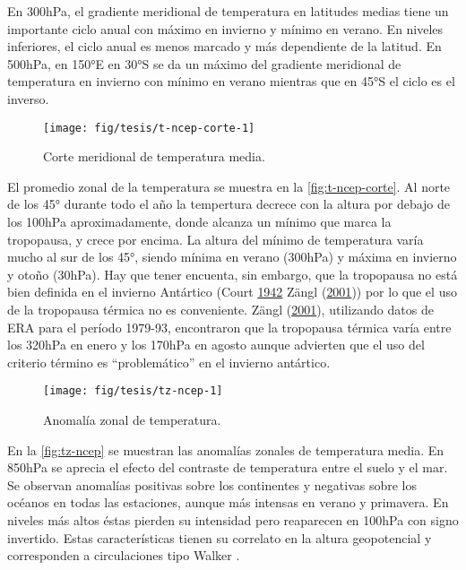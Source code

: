 \documentclass[spanish,a4paper,12p]{book}
\begin{document}
En 300hPa, el gradiente meridional de temperatura en latitudes medias
tiene un importante ciclo anual con máximo en invierno y mínimo en
verano. En niveles inferiores, el ciclo anual es menos marcado y más
dependiente de la latitud. En 500hPa, en 150°E en 30°S se da un máximo
del gradiente meridional de temperatura en invierno con mínimo en verano
mientras que en 45°S el ciclo es el inverso.

\begin{figure}

{\centering \texttt{[image: fig/tesis/t-ncep-corte-1]} 

}

\caption{Corte meridional de temperatura media.}\label{fig:t-ncep-corte}
\end{figure}

El promedio zonal de la temperatura se muestra en la
\autoref{fig:t-ncep-corte}. Al norte de los 45° durante todo el año la
tempertura decrece con la altura por debajo de los 100hPa
aproximadamente, donde alcanza un mínimo que marca la tropopausa, y
crece por encima. La altura del mínimo de temperatura varía mucho al sur
de los 45°, siendo mínima en verano (300hPa) y máxima en invierno y
otoño (30hPa). Hay que tener encuenta, sin embargo, que la tropopausa no
está bien definida en el invierno Antártico (Court
\protect\hyperlink{ref-Court1942}{1942} Zängl
(\protect\hyperlink{ref-Zangl2001}{2001})) por lo que el uso de la
tropopausa térmica no es conveniente. Zängl
(\protect\hyperlink{ref-Zangl2001}{2001}), utilizando datos de ERA para
el período 1979-93, encontraron que la tropopausa térmica varía entre
los 320hPa en enero y los 170hPa en agosto aunque advierten que el uso
del criterio término es ``problemático'' en el invierno antártico.

\begin{landscape}\begin{figure}

{\centering \texttt{[image: fig/tesis/tz-ncep-1]} 

}

\caption{Anomalía zonal de temperatura.}\label{fig:tz-ncep}
\end{figure}
\end{landscape}

En la \autoref{fig:tz-ncep} se muestran las anomalías zonales de
temperatura media. En 850hPa se aprecia el efecto del contraste de
temperatura entre el suelo y el mar. Se observan anomalías positivas
sobre los continentes y negativas sobre los océanos en todas las
estaciones, aunque más intensas en verano y primavera. En niveles más
altos éstas pierden su intensidad pero reaparecen en 100hPa con signo
invertido. Estas características tienen su correlato en la altura
geopotencial y corresponden a circulaciones tipo Walker .
\end{document}
